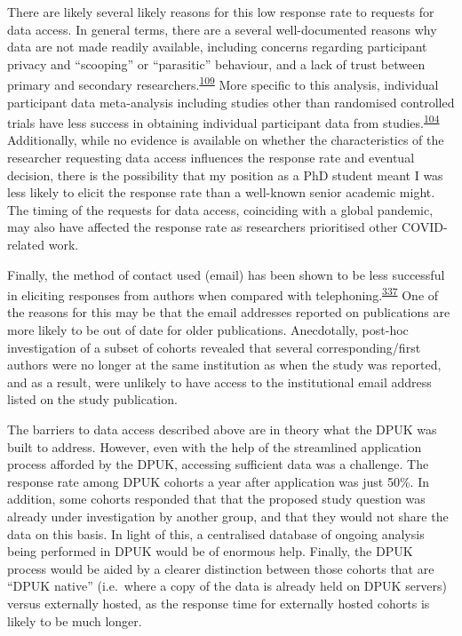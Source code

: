 \documentclass[a4paper, twoside]{templates/ociamthesis}
\begin{document}
There are likely several likely reasons for this low response rate to requests for data access. In general terms, there are a several well-documented reasons why data are not made readily available, including concerns regarding participant privacy and ``scooping'' or ``parasitic'' behaviour, and a lack of trust between primary and secondary researchers.\textsuperscript{\protect\hyperlink{ref-vanpanhuis2014}{109}} More specific to this analysis, individual participant data meta-analysis including studies other than randomised controlled trials have less success in obtaining individual participant data from studies.\textsuperscript{\protect\hyperlink{ref-nevitt2017}{104}} Additionally, while no evidence is available on whether the characteristics of the researcher requesting data access influences the response rate and eventual decision, there is the possibility that my position as a PhD student meant I was less likely to elicit the response rate than a well-known senior academic might. The timing of the requests for data access, coinciding with a global pandemic, may also have affected the response rate as researchers prioritised other COVID-related work.

Finally, the method of contact used (email) has been shown to be less successful in eliciting responses from authors when compared with telephoning.\textsuperscript{\protect\hyperlink{ref-danko2019}{337}} One of the reasons for this may be that the email addresses reported on publications are more likely to be out of date for older publications. Anecdotally, post-hoc investigation of a subset of cohorts revealed that several corresponding/first authors were no longer at the same institution as when the study was reported, and as a result, were unlikely to have access to the institutional email address listed on the study publication.

The barriers to data access described above are in theory what the DPUK was built to address. However, even with the help of the streamlined application process afforded by the DPUK, accessing sufficient data was a challenge. The response rate among DPUK cohorts a year after application was just 50\%. In addition, some cohorts responded that that the proposed study question was already under investigation by another group, and that they would not share the data on this basis. In light of this, a centralised database of ongoing analysis being performed in DPUK would be of enormous help. Finally, the DPUK process would be aided by a clearer distinction between those cohorts that are ``DPUK native'' (i.e.~where a copy of the data is already held on DPUK servers) versus externally hosted, as the response time for externally hosted cohorts is likely to be much longer.
\end{document}
